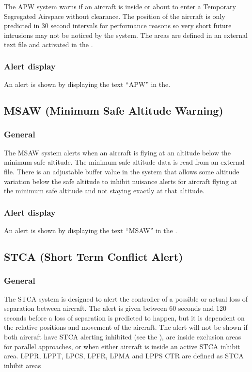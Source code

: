 \documentclass[a4paper,oneside,11pt]{memoir}
\begin{document}
The APW system warns if an aircraft is inside or about to enter a Temporary Segregated Airspace without clearance. The position of the aircraft is only predicted in 30 second intervals for performance reasons so very short future intrusions may not be noticed by the system. The areas are defined in an external text file and activated in the .

\subsubsection*{Alert display}

An alert is shown by displaying the text “APW” in the.

\subsection{MSAW (Minimum Safe Altitude Warning)}
\label{tool:MSAW}
\subsubsection*{General}


The MSAW system alerts when an aircraft is flying at an altitude below the minimum safe altitude. The minimum safe altitude data is read from an external file. There is an adjustable buffer value in the system that allows some altitude variation below the safe altitude to inhibit nuisance alerts for aircraft flying at the minimum safe altitude and not staying exactly at that altitude.

\subsubsection*{Alert display}

An alert is shown by displaying the text “MSAW” in the .

\subsection{STCA (Short Term Conflict Alert)}
\label{tool:STCA}
\subsubsection*{General}

The STCA system is designed to alert the controller of a possible or actual loss of separation between aircraft. The alert is given between 60 seconds and 120 seconds before a loss of separation is predicted to happen, but it is dependent on the relative positions and movement of the aircraft. The alert will not be shown if both aircraft have STCA alerting inhibited (see the ), are inside exclusion areas for parallel approaches, or when either aircraft is inside an active STCA inhibit area. LPPR, LPPT, LPCS, LPFR, LPMA and LPPS CTR are defined as STCA inhibit areas
\end{document}
